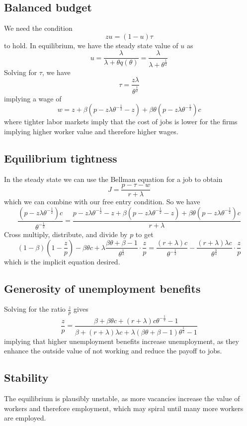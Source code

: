 \documentclass[11pt]{amsart}
\begin{document}
\subsection{Balanced budget}

We need the condition
\[
zu = (1-u) \tau
\]
to hold. In equilibrium, we have the steady state value of $u$ as
\[
u = \frac{\lambda}{\lambda + \theta q (\theta)} =  \frac{\lambda}{\lambda + \theta^{\frac{1}{2}}}
\]
Solving for $\tau$, we have
\begin{equation}
\tau = \frac{z \lambda}{\theta^{\frac{1}{2}}}
\end{equation}
implying a wage of 
\begin{equation}
w = z + \beta(p- z \lambda \theta^{-\frac{1}{2}}-z) + \beta \theta (p -  z \lambda \theta^{-\frac{1}{2}}) c
\end{equation}
where tighter labor markets imply that the cost of jobs is lower for the firms implying higher worker value and therefore higher wages.

\subsection{Equilibrium tightness}

In the steady state we can use the Bellman equation for a job to obtain
\[
J = \frac{p - \tau - w}{r + \lambda}
\]
which we can combine with our free entry condition. 
So we have
\[
\frac{(p-z\lambda \theta^{-\frac{1}{2}})c}{\theta^{-\frac{1}{2}}} = \frac{p - z\lambda \theta^{-\frac{1}{2}} - z + \beta(p- z \lambda \theta^{-\frac{1}{2}}-z) + \beta \theta (p -  z \lambda \theta^{-\frac{1}{2}}) c}{r + \lambda}
\]
Cross multiply, distribute, and divide by $p$ to get
\[
(1-\beta)(1- \frac{z}{p}) - \beta \theta c + \lambda  \frac{\beta \theta + \beta - 1}{\theta^{\frac{1}{2}}} \cdot \frac{z}{p} = \frac{(r+\lambda)c}{\theta^{-\frac{1}{2}}} - \frac{(r+\lambda) \lambda c}{\theta^{\frac{3}{4}}} \cdot \frac{z}{p}
\]
which is the implicit equation desired.

\subsection{Generosity of unemployment benefits}

Solving for the ratio $\frac{z}{p}$ gives
\[
\frac{z}{p} = \frac{ \beta + \beta \theta c + (r+\lambda)c \theta^{-\frac{1}{2}} - 1}{\beta + (r+\lambda) \lambda c + \lambda  (\beta \theta + \beta - 1) \theta^{\frac{1}{2}} -1 }
\]
implying that higher unemployment benefits increase unemployment, as they enhance the outside value of not working and reduce the payoff to jobs.

\subsection{Stability}

The equilibrium is plausibly unstable, as more vacancies increase the value of workers and therefore employment, which may spiral until many more workers are employed.
\end{document}
